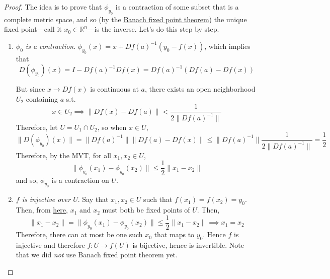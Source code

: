 \begin{proof}
		The idea is to prove that $\phi_{y_0}$ is a contraction of some subset that is a complete metric space, and so (by the \hyperref[thm:banach-fixed-point-theorem]{Banach fixed point theorem}) the unique fixed point---call it $x_0 \in \mathbb{R}^n$---is the inverse. Let's do this step by step. 
		\begin{enumerate}
			\item \textit{$\phi_0$ is a contraction}. $\phi_{y_0} (x) = x + Df(a)^{-1} (y_0 - f(x))$, which implies that 
				\begin{equation}
					D(\phi_{y_0})(x) = I - Df(a)^{-1} Df(x) = Df(a)^{-1} (Df(a) - Df(x)) 
				\end{equation}

				But since $x \to Df(x)$ is continuous at $a$, there exists an open neighborhood $U_2$ containing $a$ s.t.  
				\begin{equation}
					x \in U_2 \implies \|Df(x) - Df(a)\| < \frac{1}{2 \|Df(a)^{-1}\|}
				\end{equation}
				Therefore, let $U = U_1 \cap U_2$, so when $x \in U$, 
				\begin{equation}
					\|D(\phi_{y_0})(x)\| = \| Df(a)^{-1} \| \| Df(a) - Df(x)\| \leq \|Df(a)^{-1}\| \frac{1}{2 \|Df(a)^{-1}\|} = \frac{1}{2}
				\end{equation}
				Therefore, by the MVT, for all $x_1, x_2 \in U$, 
				\begin{equation}
					\|\phi_{y_0} (x_1) - \phi_{y_0} (x_2) \| \leq \frac{1}{2} \| x_1 - x_2\|
				\end{equation}
				and so, $\phi_{y_0}$ is a contraction on $U$. 

			\item \textit{$f$ is injective over $U$}. Say that $x_1, x_2 \in U$ such that $f(x_1) = f(x_2) = y_0$. Then, from \hyperref[eq:inv]{here}, $x_1$ and $x_2$ must both be fixed points of $U$. Then, 
				\begin{equation}
					\|x_1 - x_2\| = \|\phi_{y_0} (x_1) - \phi_{y_0} (x_2)\| \leq \frac{1}{2} \|x_1 - x_2\| \implies x_1 = x_2
				\end{equation}
				Therefore, there can at most be one such $x_0$ that maps to $y_0$. Hence $f$ is injective and therefore $f: U \to f(U)$ is bijective, hence is invertible. Note that we did \textit{not} use Banach fixed point theorem yet. 


\end{enumerate}
\end{proof}
